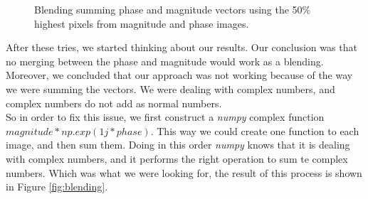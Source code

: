 \documentclass[12pt,a4paper]{article}
\begin{document}
\begin{figure}[!h]
	\centering
	{%
		\setlength{\fboxsep}{1pt}%
		\setlength{\fboxrule}{1pt}%
	}%
	\caption{Blending summing phase and magnitude vectors using the 50\% highest pixels from magnitude and phase images.}
	\label{fig:fourier2}
\end{figure}

After these tries, we started thinking about our results. Our conclusion was that no merging between the phase and magnitude would work as a blending. Moreover, we concluded that our approach was not working because of the way we were summing the vectors. We were dealing with complex numbers, and complex numbers do not add as normal numbers.  \\

So in order to fix this issue, we first construct a \emph{numpy} complex function $magnitude * np.exp(1j*phase)$. This way we could create one function to each image, and then sum them. Doing in this order \emph{numpy} knows that it is dealing with complex numbers, and it performs the right operation to sum te complex numbers. Which was what we were looking for, the result of this process is shown in Figure \ref{fig:blending}. \\
\end{document}
